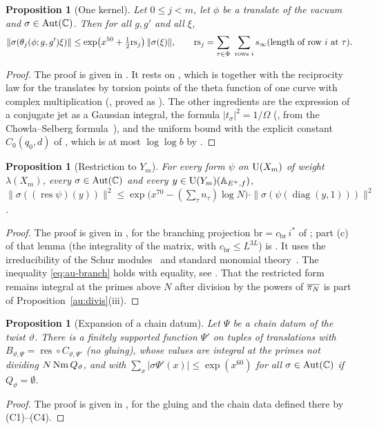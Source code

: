 \documentclass[10pt]{amsart}
\newtheorem{proposition}[theorem]{Proposition}
\theoremstyle{definition}
\theoremstyle{remark}
\newcommand{\C}{\mathbb C}
\begin{document}
\begin{proposition}[One kernel]\label{au:kernel}
Let $0\le j<m$, let $\phi$ be a translate of the vacuum and $\sigma\in\auAut(\C)$. Then for all
$g,g'$ and all $\xi$,
\[
\|\sigma(\theta_j(\phi;g,g')\xi)\|\le\exp\bigl(x^{50}+\tfrac12\mathrm{rs}_j\bigr)\,\|\sigma(\xi)\|,
\qquad\mathrm{rs}_j=\sum_{\tau\in\Phi}\ \sum_{\text{rows }i}s_\infty(\text{length of row }i
\text{ at }\tau).
\]
\end{proposition}
\begin{proof}
The proof is given in {\cite[\S5.1.5]{P49}}. It rests on {\cite[Lemma~5.7]{P49}}, which is
{\cite[Proposition~5.27]{P49}} together with the reciprocity law for the translates by torsion points of
the theta function of one curve with complex multiplication ({\cite[Proposition~5.25(C3)(ii)]{P49}},
proved as {\cite[Theorem~7.9]{P49}}). The other ingredients are the expression of a conjugate jet as a
Gaussian integral, the formula $|t_\sigma|^2=1/\Omega$ ({\cite[Proposition~5.25(C4)]{P49}}, from the
Chowla--Selberg formula~\cite{ChowlaSelberg}), and the uniform bound with the explicit constant
$C_0(q_0,d)$ of {\cite[(76)]{P49}}, which is at most $\log\log b$ by {\cite[Lemma~8.7]{P49}}.
\end{proof}

\begin{proposition}[Restriction to $Y_m$]\label{au:restrict}
For every form $\psi$ on $\mathrm U(X_m)$ of weight $\lambda(X_m)$, every $\sigma\in\auAut(\C)$ and
every $y\in\mathrm U(Y_m)(\mathbb A_{E^+,f})$,
$\|\sigma((\operatorname{res}\psi)(y))\|^2\le\exp\bigl(x^{70}-(\sum_\tau n_\tau)\log N\bigr)\cdot
\|\sigma(\psi(\operatorname{diag}(y,1)))\|^2$.
\end{proposition}
\begin{proof}
The proof is given in {\cite[\S5.1.4]{P49}}, for the branching projection
$\mathrm{br}=c_{\mathrm{br}}\,i^*$ of {\cite[Lemma~5.6]{P49}}; part (c) of that lemma (the
integrality of the matrix, with $c_{\mathrm{br}}\le L^{3L}$) is {\cite[Proposition~5.24]{P49}}.
It uses the irreducibility of the Schur modules~\cite{FultonYT} and standard
monomial theory~\cite{DEP}. The inequality \eqref{eq:au-branch} holds with equality, see
{\cite[(39)]{P49}}. That the restricted form remains integral at the primes above $N$ after
division by the powers of $\overline{\pi_N}$ is part of Proposition~\ref{au:divis}(iii).
\end{proof}

\begin{proposition}[Expansion of a chain datum]\label{au:expansion}
Let $\Psi$ be a chain datum of the twist $\vartheta$. There is a finitely supported function
$\Psi'$ on tuples of translations with $B_{\vartheta,\Psi}=\operatorname{res}\circ C_{\vartheta,
\Psi'}$ (no gluing), whose values are integral at the primes not dividing $N\operatorname{Nm} Q_\vartheta$,
and with $\sum_x|\sigma\Psi'(x)|\le\exp(x^{60})$ for all $\sigma\in\auAut(\C)$ if
$Q_\vartheta=\emptyset$.
\end{proposition}
\begin{proof}
The proof is given in {\cite[\S5.1.6]{P49}}, for the gluing and the chain data defined
there by (C1)--(C4).
\end{proof}
\end{document}
